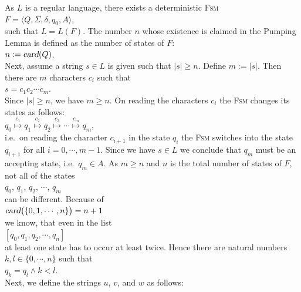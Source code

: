\proofEng
As $L$ is a regular language, there exists a deterministic \textsc{Fsm}
\\[0.2cm]
\hspace*{1.3cm}
$F = \langle Q, \Sigma, \delta, q_0, A \rangle$,
\\[0.2cm]
such that $L = L(F)$.  The number $n$ whose existence is claimed in the Pumping Lemma is defined as
the number of states of $F$: 
\\[0.2cm]
\hspace*{1.3cm}
$n := \textsl{card}(Q)$.
\\[0.2cm]
Next, assume a string $s \in L$ is given such that $|s| \geq n$.  Define $m := |s|$. Then there are $m$
characters $c_i$ such that
\\[0.2cm]
\hspace*{1.3cm}
$s = c_1 c_2 \cdots c_m$.
\\[0.2cm]
Since $|s| \geq n$, we have $m \geq n$.  On reading the characters $c_i$ the \textsc{Fsm} changes its
states as follows:
\\[0.2cm]
\hspace*{1.3cm}
$q_0 \stackrel{c_1}{\longmapsto} q_1 \stackrel{c_2}{\longmapsto} q_2 \stackrel{c_3}{\longmapsto} \cdots \stackrel{c_m}{\longmapsto} q_m$,
\\[0.2cm]
i.e.~on reading the character $c_{i+1}$ in the state $q_i$ the \textsc{Fsm} switches into the state $q_{i+1}$
for all $i=0,\cdots,m-1$.
Since we have  $s \in L$ we conclude that  $q_m$ must be an accepting state, i.e.~$q_m \in A$.
As $m \geq n$ and $n$ is the total number of states of $F$, not all of the states 
\\[0.2cm]
\hspace*{1.3cm}
$q_0$, $q_1$, $q_2$, $\cdots$, $q_m$
\\[0.2cm]
can be different.
Because of
\\[0.2cm]
\hspace*{1.3cm}
$\textsl{card}\bigl(\{0,1,\cdots,n\}\bigr) = n+1$
\\[0.2cm]
we know, that even in the list
\\[0.2cm]
\hspace*{1.3cm}
$[q_0,q_1,q_2,\cdots, q_{n}]$
\\[0.2cm]
at least one state has to occur at least twice.  Hence there are natural numbers $k, l \in \{0,\cdots,n\}$ such that
\\[0.2cm]
\hspace*{1.3cm}
$q_k = q_l \wedge k < l$.
\\[0.2cm]
Next, we define the strings $u$, $v$, and $w$ as follows:
